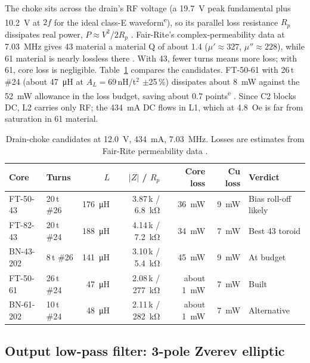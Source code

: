 \documentclass[11pt,letterpaper]{article}
\newcommand{\est}{\textsuperscript{e}}
\begin{document}
The choke sits across the drain's RF voltage (a \SI{19.7}{\volt} peak fundamental plus \SI{10.2}{\volt} at $2f$ for the ideal class-E waveform\est), so its parallel loss resistance $R_p$ dissipates real power, $P\approx V^2/2R_p$ \cite{projnotes}. Fair-Rite's complex-permeability data at \SI{7.03}{\mega\hertz} gives 43 material a material Q of about 1.4 ($\mu'\approx327$, $\mu''\approx228$), while 61 material is nearly lossless there \cite{fairrite43,projnotes}. With 43, fewer turns means more loss; with 61, core loss is negligible. Table~\ref{tab:choke} compares the candidates. FT-50-61 with 26\,t \#24 (about \SI{47}{\micro\henry} at $A_L=69$\,nH/t$^2$ $\pm$25\,\%) dissipates about \SI{8}{\milli\watt} against the \SI{52}{\milli\watt} allowance in the loss budget, saving about 0.7 points\est{} \cite{fairrite61,projnotes}. Since C2 blocks DC, L2 carries only RF; the \SI{434}{\milli\ampere} DC flows in L1, which at \SI{4.8}{Oe} is far from saturation in 61 material.

\begin{table}[h]
\centering\small
\caption{Drain-choke candidates at \SI{12.0}{\volt}, \SI{434}{\milli\ampere}, \SI{7.03}{\mega\hertz}. Losses are estimates from Fair-Rite permeability data \cite{projnotes,fairrite43,fairrite61}.}\label{tab:choke}
\begin{tabular}{@{}llrrrrl@{}}
\toprule
Core & Turns & $L$ & $|Z|$ / $R_p$ & Core loss & Cu loss & Verdict \\ \midrule
FT-50-43 & 20\,t \#26 & \SI{176}{\micro\henry} & 3.87\,k / \SI{6.8}{\kilo\ohm} & \SI{36}{\milli\watt} & \SI{9}{\milli\watt} & Bias roll-off likely \\
FT-82-43 & 20\,t \#24 & \SI{188}{\micro\henry} & 4.14\,k / \SI{7.2}{\kilo\ohm} & \SI{34}{\milli\watt} & \SI{7}{\milli\watt} & Best 43 toroid \\
BN-43-202 & 8\,t \#26 & \SI{141}{\micro\henry} & 3.10\,k / \SI{5.4}{\kilo\ohm} & \SI{45}{\milli\watt} & \SI{9}{\milli\watt} & At budget \\
FT-50-61 & 26\,t \#24 & \SI{47}{\micro\henry} & 2.08\,k / \SI{277}{\kilo\ohm} & about \SI{1}{\milli\watt} & \SI{7}{\milli\watt} & Built \\
BN-61-202 & 10\,t \#24 & \SI{48}{\micro\henry} & 2.11\,k / \SI{282}{\kilo\ohm} & about \SI{1}{\milli\watt} & \SI{7}{\milli\watt} & Alternative \\
\bottomrule
\end{tabular}
\end{table}

\subsection{Output low-pass filter: 3-pole Zverev elliptic}\label{sec:lpf}
\end{document}
